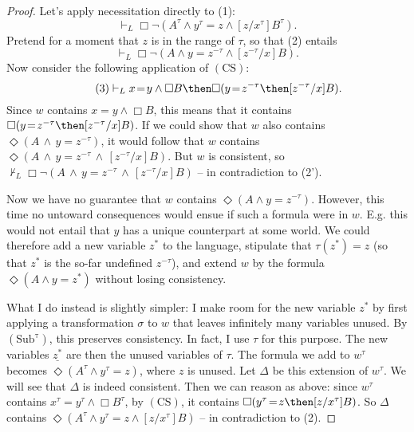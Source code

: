 \documentclass[11pt]{woarticle}
\theoremstyle{break}
\theoremstyle{nonumberplain}
\newcommand{\1}{\;\,|\;\,}
\renewcommand{\vec}[1]{\ensuremath{\underline{#1}}}
\newcommand{\T}[1]{\ensuremath{(\mathrm{ #1})}}
\begin{document}
\begin{proof}
{    Let's apply necessitation directly to (1):
    \begin{equation}\tag{2}
      \vdash_L \Box \neg (A^\tau \land y^\tau\!=\!z \land [z/x^\tau]B^\tau).
    \end{equation}
    Pretend for a moment that $z$ is in the range of $\tau$, so that
    (2) entails
    \begin{equation}\tag{2'}
      \vdash_L \Box \neg (A \land y\!=\!z^{-\tau} \land [z^{-\tau}/x]B).
    \end{equation}
    Now consider the following application of \T{CS}:
    \begin{equation}\tag{3}
      \vdash_L x\!=\!y \land \Box B \then \Box(y\!=\!z^{-\tau} 
      \then [z^{-\tau}/x]B).
    \end{equation}
    Since $w$ contains $x\!=\!y \land \Box B$, this means that it
    contains $\Box(y\!=\!z^{-\tau} \then [z^{-\tau}/x]B)$. If we could
    show that $w$ also contains $\Diamond(A \,\land\,
    y\!=\!z^{-\tau})$, it would follow that $w$ contains $\Diamond(A
    \,\land\, y\!=\!z^{-\tau} \,\land\, [z^{-\tau}/x]B)$. But $w$ is
    consistent, so $\not\vdash_L \Box\neg(A \,\land\, y\!=\!z^{-\tau}
    \,\land\, [z^{-\tau}/x]B)$ -- in contradiction to (2').

    Now we have no guarantee that $w$ contains $\Diamond(A \land
    y\!=\!z^{-\tau})$. However, this time no untoward consequences
    would ensue if such a formula were in $w$. E.g. this would not
    entail that $y$ has a unique counterpart at some world. We could
    therefore add a new variable $z^{*}$ to the language, stipulate
    that $\tau(z^*) = z$ (so that $z^*$ is the so-far undefined
    $z^{-\tau}$), and extend $w$ by the formula $\Diamond(A \land
    y\!=\!z^*)$ without losing consistency.

    What I do instead is slightly simpler: I make room for the new
    variable $z^*$ by first applying a transformation $\sigma$ to $w$
    that leaves infinitely many variables unused. By \T{Sub^\tau},
    this preserves consistency. In fact, I use $\tau$ for this
    purpose. The new variables $\vec{z^*}$ are then the unused
    variables of $\tau$. The formula we add to $w^\tau$ becomes
    $\Diamond (A^\tau \land y^\tau\!=\!z)$, where $z$ is unused. Let
    $\Delta$ be this extension of $w^\tau$. We will see that $\Delta$
    is indeed consistent. Then we can reason as above: since $w^\tau$
    contains $x^\tau\!=\!y^\tau \land \Box B^\tau$, by \T{CS}, it
    contains $\Box(y^\tau\!=\!z \then [z/x^\tau]B)$.  So $\Delta$
    contains $\Diamond (A^\tau \land y^\tau\!=\!z \land [z/x^\tau]B)$
    -- in contradiction to (2).
  
}
\end{proof}
\end{document}
